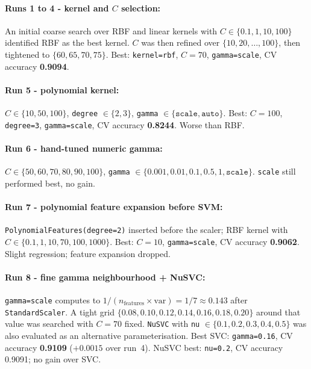 \documentclass[11pt]{article}
\begin{document}
\paragraph{Runs 1 to 4 - kernel and $C$ selection:}
An initial coarse search over RBF and linear kernels with $C \in \{0.1, 1, 10, 100\}$ identified RBF as the best kernel.
$C$ was then refined over $\{10, 20, \ldots, 100\}$, then tightened to $\{60, 65, 70, 75\}$.
Best: \texttt{kernel=rbf}, $C=70$, \texttt{gamma=scale}, CV accuracy \textbf{0.9094}.

\paragraph{Run 5 - polynomial kernel:}
$C \in \{10, 50, 100\}$, \texttt{degree} $\in \{2, 3\}$, \texttt{gamma} $\in \{\texttt{scale}, \texttt{auto}\}$.
Best: $C=100$, \texttt{degree=3}, \texttt{gamma=scale}, CV accuracy \textbf{0.8244}. Worse than RBF.

\paragraph{Run 6 - hand-tuned numeric gamma:}
$C \in \{50, 60, 70, 80, 90, 100\}$, \texttt{gamma} $\in \{0.001, 0.01, 0.1, 0.5, 1, \texttt{scale}\}$.
\texttt{scale} still performed best, no gain.

\paragraph{Run 7 - polynomial feature expansion before SVM:}
\texttt{PolynomialFeatures(degree=2)} inserted before the scaler; RBF kernel with
$C \in \{0.1, 1, 10, 70, 100, 1000\}$.
Best: $C=10$, \texttt{gamma=scale}, CV accuracy \textbf{0.9062}. Slight regression; feature expansion dropped.

\paragraph{Run 8 - fine gamma neighbourhood + NuSVC:}
\texttt{gamma=scale} computes to $1/(n_{\mathrm{features}} \times \mathrm{var}) = 1/7 \approx 0.143$ after \texttt{StandardScaler}.
A tight grid $\{0.08, 0.10, 0.12, 0.14, 0.16, 0.18, 0.20\}$ around that value was searched with $C=70$ fixed.
\texttt{NuSVC} with \texttt{nu} $\in \{0.1, 0.2, 0.3, 0.4, 0.5\}$ was also evaluated as an alternative parameterisation.
Best SVC: \texttt{gamma=0.16}, CV accuracy \textbf{0.9109} ($+0.0015$ over run~4).
NuSVC best: \texttt{nu=0.2}, CV accuracy 0.9091; no gain over SVC.
\end{document}
